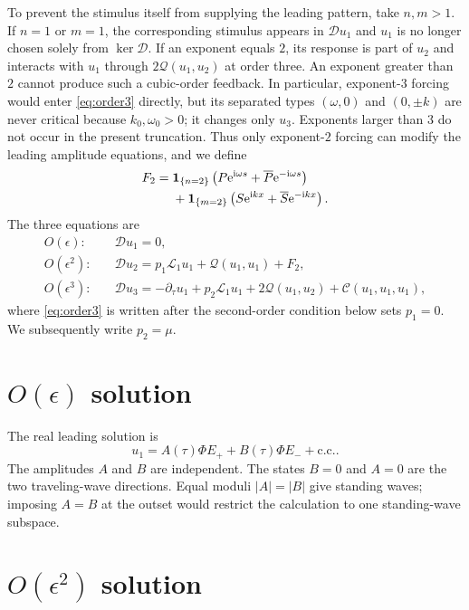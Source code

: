 \documentclass[11pt]{article}
\newcommand{\ii}{\mathrm{i}}
\newcommand{\ee}{\mathrm{e}}
\newcommand{\cQ}{\mathcal{Q}}
\newcommand{\cC}{\mathcal{C}}
\newcommand{\cL}{\mathcal{L}}
\newcommand{\cD}{\mathcal{D}}
\newcommand{\cc}{\mathrm{c.c.}}
\newcommand{\one}[1]{\bm{1}_{\{#1\}}}
\begin{document}
To prevent the stimulus itself from supplying the leading pattern, take
$n,m>1$.  If $n=1$ or $m=1$, the corresponding stimulus appears in
$\cD u_1$ and $u_1$ is no longer chosen solely from $\ker\cD$.  If an
exponent equals $2$, its response is part of $u_2$ and interacts with $u_1$
through $2\cQ(u_1,u_2)$ at order three.  An exponent greater than $2$ cannot
produce such a cubic-order feedback.  In particular, exponent-$3$ forcing
would enter \eqref{eq:order3} directly, but its separated types $(\omega,0)$
and $(0,\pm k)$ are never critical because $k_0,\omega_0>0$; it changes only
$u_3$.  Exponents larger than $3$ do not occur in the present truncation.
Thus only exponent-$2$ forcing can modify the leading amplitude equations,
and we define
\begin{align}
 F_2={}&\one{n=2}
 \left(P\ee^{\ii\omega s}+\overline P\ee^{-\ii\omega s}\right)
 \notag\\
 &+\one{m=2}
 \left(S\ee^{\ii kx}+\overline S\ee^{-\ii kx}\right).
 \label{eq:F2}
\end{align}
The three equations are
\begin{subequations}
\label{eq:three-orders}
\begin{align}
 O(\epsilon):\quad
 &\cD u_1=0,
 \label{eq:order1}\\
 O(\epsilon^2):\quad
 &\cD u_2=p_1\cL_1u_1+\cQ(u_1,u_1)+F_2,
 \label{eq:order2}\\
 O(\epsilon^3):\quad
 &\cD u_3=-\partial_\tau u_1+p_2\cL_1u_1
 +2\cQ(u_1,u_2)+\cC(u_1,u_1,u_1),
 \label{eq:order3}
\end{align}
\end{subequations}
where \eqref{eq:order3} is written after the second-order condition below
sets $p_1=0$.  We subsequently write $p_2=\mu$.

\section{\texorpdfstring{$O(\epsilon)$}{O(epsilon)} solution}

The real leading solution is
\begin{equation}
 \boxed{
 u_1=A(\tau)\Phi E_+ +B(\tau)\Phi E_-+\cc.}
 \label{eq:u1}
\end{equation}
The amplitudes $A$ and $B$ are independent.  The states $B=0$ and $A=0$ are
the two traveling-wave directions.  Equal moduli $|A|=|B|$ give standing
waves; imposing $A=B$ at the outset would restrict the calculation to one
standing-wave subspace.

\section{\texorpdfstring{$O(\epsilon^2)$}{O(epsilon squared)} solution}
\end{document}
